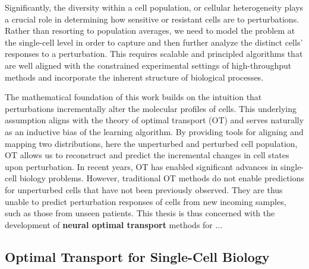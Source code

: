 Significantly, the diversity within a cell population, or cellular heterogeneity plays a crucial role in determining how sensitive or resistant cells are to perturbations.
Rather than resorting to population averages, we need to model the problem at the single-cell level in order to capture and then further analyze the distinct cells' responses to a perturbation. This requires scalable and principled algorithms that are well aligned with the constrained experimental settings of high-throughput methods and incorporate the inherent structure of biological processes.

The mathematical foundation of this work builds on the intuition that perturbations incrementally alter the molecular profiles of cells. This underlying assumption aligns with the theory of optimal transport (OT) and serves naturally as an inductive bias of the learning algorithm. By providing tools for aligning and mapping two distributions, here the unperturbed and perturbed cell population, OT allows us to reconstruct and predict the incremental changes in cell states upon perturbation. 
In recent years, OT has enabled significant advances in single-cell biology problems. However, traditional OT methods do not enable predictions for unperturbed cells that have not been previously observed.
They are thus unable to predict perturbation responses of cells from new incoming samples, such as those from unseen patients. 
This thesis is thus concerned with the development of \textbf{neural optimal transport} methods for ...

\subsection{Optimal Transport for Single-Cell Biology}
\label{sec:ot_for_biology}

